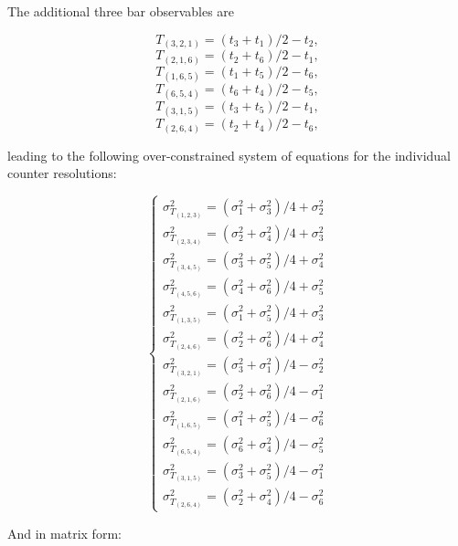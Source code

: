 The additional three bar observables are

\[T_{(3,2,1)} = (t_3 + t_1)/2 - t_2,\]
\[T_{(2,1,6)} = (t_2 + t_6)/2 - t_1,\]
\[T_{(1,6,5)} = (t_1 + t_5)/2 - t_6,\]
\[T_{(6,5,4)} = (t_6 + t_4)/2 - t_5,\]
\[T_{(3,1,5)} = (t_3 + t_5)/2 - t_1,\]
\[T_{(2,6,4)} = (t_2 + t_4)/2 - t_6,\]

leading to the following over-constrained system of equations for the
individual counter resolutions:

\[\begin{cases}
\sigma_{T_{(1,2,3)}}^2 = (\sigma_1^2 + \sigma_3^2)/4 + \sigma_2^2\\
\sigma_{T_{(2,3,4)}}^2 = (\sigma_2^2 + \sigma_4^2)/4 + \sigma_3^2\\
\sigma_{T_{(3,4,5)}}^2 = (\sigma_3^2 + \sigma_5^2)/4 + \sigma_4^2\\
\sigma_{T_{(4,5,6)}}^2 = (\sigma_4^2 + \sigma_6^2)/4 + \sigma_5^2\\
\sigma_{T_{(1,3,5)}}^2 = (\sigma_1^2 + \sigma_5^2)/4 + \sigma_3^2\\
\sigma_{T_{(2,4,6)}}^2 = (\sigma_2^2 + \sigma_6^2)/4 + \sigma_4^2\\
\sigma_{T_{(3,2,1)}}^2 = (\sigma_3^2 + \sigma_1^2)/4 - \sigma_2^2\\
\sigma_{T_{(2,1,6)}}^2 = (\sigma_2^2 + \sigma_6^2)/4 - \sigma_1^2\\
\sigma_{T_{(1,6,5)}}^2 = (\sigma_1^2 + \sigma_5^2)/4 - \sigma_6^2\\
\sigma_{T_{(6,5,4)}}^2 = (\sigma_6^2 + \sigma_4^2)/4 - \sigma_5^2\\
\sigma_{T_{(3,1,5)}}^2 = (\sigma_3^2 + \sigma_5^2)/4 - \sigma_1^2\\
\sigma_{T_{(2,6,4)}}^2 = (\sigma_2^2 + \sigma_4^2)/4 - \sigma_6^2
\end{cases}\]

And in matrix form:


